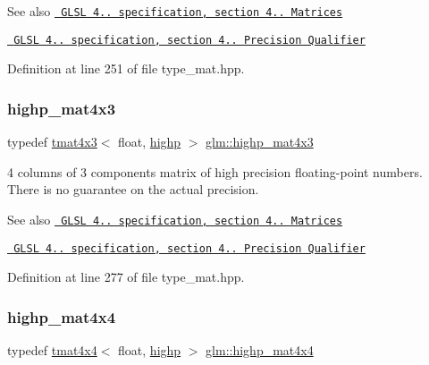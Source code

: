 \begin{DoxySeeAlso}{See also}
\href{http://www.opengl.org/registry/doc/GLSLangSpec.4.20.8.pdf}{\texttt{ G\+L\+SL 4.. specification, section 4.. Matrices}} 

\href{http://www.opengl.org/registry/doc/GLSLangSpec.4.20.8.pdf}{\texttt{ G\+L\+SL 4.. specification, section 4.. Precision Qualifier}} 
\end{DoxySeeAlso}


Definition at line 251 of file type\+\_\+mat.\+hpp.

\mbox{\label{group__core__precision_ga549b3b126dfbf5f9fef6b76deb15cb4e}} 
\subsubsection{\texorpdfstring{highp\_mat4x3}{highp\_mat4x3}}
{\footnotesize\ttfamily typedef \mbox{\hyperlink{structglm_1_1tmat4x3}{tmat4x3}}$<$ float, \mbox{\hyperlink{namespaceglm_a0f04f086094c747d227af4425893f545ac6f7eab42eacbb10d59a58e95e362074}{highp}} $>$ \mbox{\hyperlink{group__core__precision_ga549b3b126dfbf5f9fef6b76deb15cb4e}{glm\+::highp\+\_\+mat4x3}}}

4 columns of 3 components matrix of high precision floating-\/point numbers. There is no guarantee on the actual precision.

\begin{DoxySeeAlso}{See also}
\href{http://www.opengl.org/registry/doc/GLSLangSpec.4.20.8.pdf}{\texttt{ G\+L\+SL 4.. specification, section 4.. Matrices}} 

\href{http://www.opengl.org/registry/doc/GLSLangSpec.4.20.8.pdf}{\texttt{ G\+L\+SL 4.. specification, section 4.. Precision Qualifier}} 
\end{DoxySeeAlso}


Definition at line 277 of file type\+\_\+mat.\+hpp.

\mbox{\label{group__core__precision_gaccec2a0346f946bcbd656386a9ab87d7}} 
\subsubsection{\texorpdfstring{highp\_mat4x4}{highp\_mat4x4}}
{\footnotesize\ttfamily typedef \mbox{\hyperlink{structglm_1_1tmat4x4}{tmat4x4}}$<$ float, \mbox{\hyperlink{namespaceglm_a0f04f086094c747d227af4425893f545ac6f7eab42eacbb10d59a58e95e362074}{highp}} $>$ \mbox{\hyperlink{group__core__precision_gaccec2a0346f946bcbd656386a9ab87d7}{glm\+::highp\+\_\+mat4x4}}}


